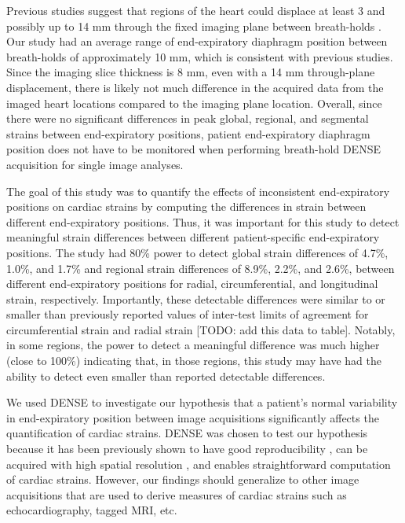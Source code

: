 	Previous studies suggest that regions of the heart could displace at least 3 and possibly up to 14 mm through the fixed imaging plane between breath-holds \cite{Slomka2007,Swingen2003,Wang1995b,McLeish2002}. Our study had an average range of end-expiratory diaphragm position between breath-holds of approximately 10 mm, which is consistent with previous studies. Since the imaging slice thickness is 8 mm, even with a 14 mm through-plane displacement, there is likely not much difference in the acquired data from the imaged heart locations compared to the imaging plane location. Overall, since there were no significant differences in peak global, regional, and segmental strains between end-expiratory positions, patient end-expiratory diaphragm position does not have to be monitored when performing breath-hold DENSE acquisition for single image analyses.
	
	The goal of this study was to quantify the effects of inconsistent end-expiratory positions on cardiac strains by computing the differences in strain between different end-expiratory positions. Thus, it was important for this study to detect meaningful strain differences between different patient-specific end-expiratory positions. The study had 80\% power to detect global strain differences of 4.7\%, 1.0\%, and 1.7\% and regional strain differences of 8.9\%, 2.2\%, and 2.6\%, between different end-expiratory positions for radial, circumferential, and longitudinal strain, respectively. Importantly, these detectable differences were similar to or smaller than previously reported values of inter-test limits of agreement for circumferential strain and radial strain \cite{Wehner2015a} [TODO: add this data to table]. Notably, in some regions, the power to detect a meaningful difference was much higher (close to 100\%) indicating that, in those regions, this study may have had the ability to detect even smaller than reported detectable differences.
	
	We used DENSE to investigate our hypothesis that a patient's normal variability in end-expiratory position between image acquisitions significantly affects the quantification of cardiac strains. DENSE was chosen to test our hypothesis because it has been previously shown to have good reproducibility \cite{Haggerty2013}, can be acquired with high spatial resolution \cite{Aletras1999b,Aletras1999c}, and enables straightforward computation of cardiac strains. However, our findings should generalize to other image acquisitions that are used to derive measures of cardiac strains such as echocardiography, tagged MRI, etc.

